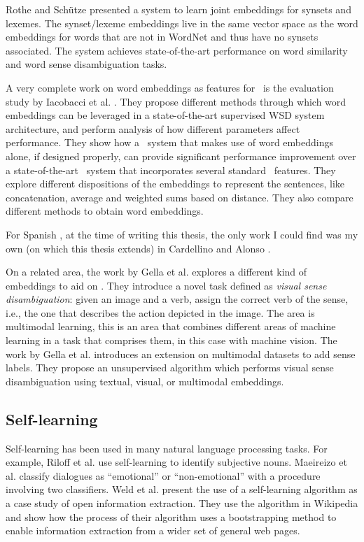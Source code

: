 Rothe and Sch\"utze \cite{rothe-schutze:2015:ACL-IJCNLP} presented a system to
learn joint embeddings for synsets and lexemes. The synset/lexeme embeddings
live in the same vector space as the word embeddings for words that are not in
WordNet and thus have no synsets associated. The system achieves
state-of-the-art performance on word similarity and word sense disambiguation
tasks.

A very complete work on word embeddings as features for \wsd~is the evaluation
study by Iacobacci et al. \cite{iacobacci-pilehvar-navigli:2016:P16-1}. They
propose different methods through which word embeddings can be leveraged in a
state-of-the-art supervised WSD system architecture, and perform analysis of
how different parameters affect performance. They show how a \wsd~system that
makes use of word embeddings alone, if designed properly, can provide
significant performance improvement over a state-of-the-art \wsd~system that
incorporates several standard \wsd~features. They explore different
dispositions of the embeddings to represent the sentences, like concatenation,
average and weighted sums based on distance. They also compare different
methods to obtain word embeddings.

For Spanish \wsd, at the time of writing this thesis, the only work I could
find was my own (on which this thesis extends) in Cardellino and Alonso
\cite{cardellinodisjoint}.

On a related area, the work by Gella et al. \cite{Gella:2016aa} explores a
different kind of embeddings to aid on \vsd. They introduce a novel task
defined as {\em visual sense disambiguation}: given an image and a verb, assign
the correct verb of the sense, i.e., the one that describes the action depicted
in the image. The area is multimodal learning, this is an area that combines
different areas of machine learning in a task that comprises them, in this case
\nlp with machine vision. The work by Gella et al. introduces an extension on
multimodal datasets to add sense labels. They propose an unsupervised algorithm
which performs visual sense disambiguation using textual, visual, or multimodal
embeddings.

\subsection{Self-learning}\label{sec:domain_background:self-learning}

Self-learning has been used in many natural language processing tasks. For
example, Riloff et al. \cite{Riloff:2003:LSN:1119176.1119180} use self-learning
to identify subjective nouns. Maeireizo et al.
\cite{Maeireizo:2004:CPE:1219044.1219072} classify dialogues as ``emotional''
or ``non-emotional'' with a procedure involving two classifiers. Weld et al.
\cite{Weld:2009:UWB:1519103.1519113} present the use of a self-learning
algorithm as a case study of open information extraction. They use the
algorithm in Wikipedia and show how the process of their algorithm uses a
bootstrapping method to enable information extraction from a wider set of
general web pages.

